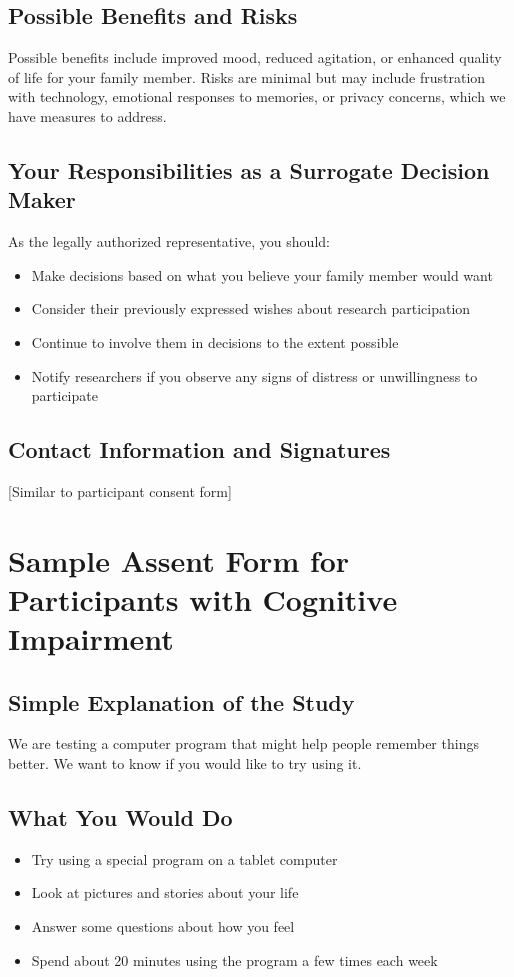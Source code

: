 \subsection{Possible Benefits and Risks}
Possible benefits include improved mood, reduced agitation, or enhanced quality of life for your family member. Risks are minimal but may include frustration with technology, emotional responses to memories, or privacy concerns, which we have measures to address.

\subsection{Your Responsibilities as a Surrogate Decision Maker}
As the legally authorized representative, you should:
\begin{itemize}
    \item Make decisions based on what you believe your family member would want
    \item Consider their previously expressed wishes about research participation
    \item Continue to involve them in decisions to the extent possible
    \item Notify researchers if you observe any signs of distress or unwillingness to participate
\end{itemize}

\subsection{Contact Information and Signatures}
[Similar to participant consent form]

\section{Sample Assent Form for Participants with Cognitive Impairment}

\subsection{Simple Explanation of the Study}
We are testing a computer program that might help people remember things better. We want to know if you would like to try using it.

\subsection{What You Would Do}
\begin{itemize}
    \item Try using a special program on a tablet computer
    \item Look at pictures and stories about your life
    \item Answer some questions about how you feel
    \item Spend about 20 minutes using the program a few times each week
\end{itemize}


